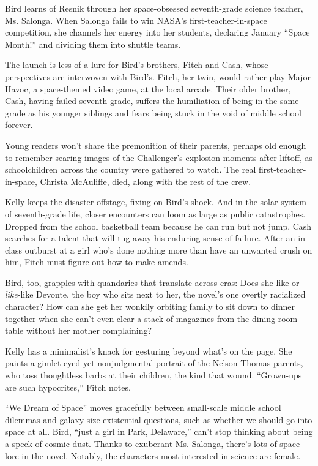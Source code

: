 Bird learns of Resnik through her space-obsessed seventh-grade science
teacher, Ms. Salonga. When Salonga fails to win NASA's
first-teacher-in-space competition, she channels her energy into her
students, declaring January ``Space Month!'' and dividing them into
shuttle teams.

The launch is less of a lure for Bird's brothers, Fitch and Cash, whose
perspectives are interwoven with Bird's. Fitch, her twin, would rather
play Major Havoc, a space-themed video game, at the local arcade. Their
older brother, Cash, having failed seventh grade, suffers the
humiliation of being in the same grade as his younger siblings and fears
being stuck in the void of middle school forever.

Young readers won't share the premonition of their parents, perhaps old
enough to remember searing images of the Challenger's explosion moments
after liftoff, as schoolchildren across the country were gathered to
watch. The real first-teacher-in-space, Christa McAuliffe, died, along
with the rest of the crew.

Kelly keeps the disaster offstage, fixing on Bird's shock. And in the
solar system of seventh-grade life, closer encounters can loom as large
as public catastrophes. Dropped from the school basketball team because
he can run but not jump, Cash searches for a talent that will tug away
his enduring sense of failure. After an in-class outburst at a girl
who's done nothing more than have an unwanted crush on him, Fitch must
figure out how to make amends.

Bird, too, grapples with quandaries that translate across eras: Does she
like or \emph{like}-like Devonte, the boy who sits next to her, the
novel's one overtly racialized character? How can she get her wonkily
orbiting family to sit down to dinner together when she can't even clear
a stack of magazines from the dining room table without her mother
complaining?

Kelly has a minimalist's knack for gesturing beyond what's on the page.
She paints a gimlet-eyed yet nonjudgmental portrait of the Nelson-Thomas
parents, who toss thoughtless barbs at their children, the kind that
wound. ``Grown-ups are such hypocrites,'' Fitch notes.

``We Dream of Space'' moves gracefully between small-scale middle school
dilemmas and galaxy-size existential questions, such as whether we
should go into space at all. Bird, ``just a girl in Park, Delaware,''
can't stop thinking about being a speck of cosmic dust. Thanks to
exuberant Ms. Salonga, there's lots of space lore in the novel. Notably,
the characters most interested in science are female.

